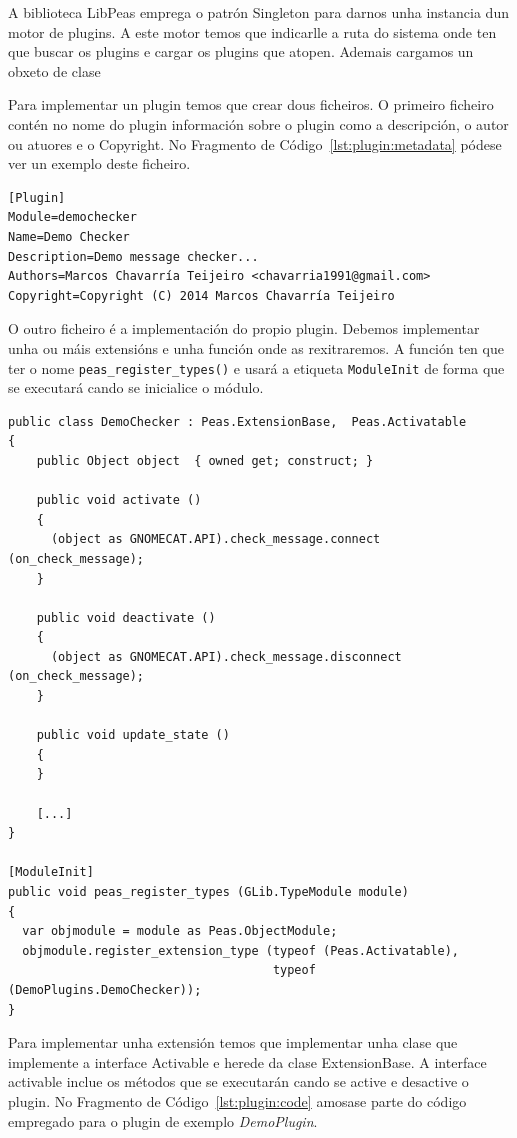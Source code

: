 A biblioteca LibPeas emprega o patrón Singleton para darnos unha instancia dun motor de plugins. A este motor temos que indicarlle a ruta do sistema onde ten que buscar os plugins e cargar os plugins que atopen. Ademais cargamos un obxeto de clase

Para implementar un plugin temos que crear dous ficheiros. O primeiro ficheiro contén no nome do plugin información sobre o plugin como a descripción, o autor ou atuores e o Copyright. No Fragmento de Código~\ref{lst:plugin:metadata} pódese ver un exemplo deste ficheiro.

\begin{lstlisting}[label=lst:plugin:metadata,caption=Ficheiro de metadatos do plugin]
[Plugin]
Module=demochecker
Name=Demo Checker
Description=Demo message checker...
Authors=Marcos Chavarría Teijeiro <chavarria1991@gmail.com>
Copyright=Copyright (C) 2014 Marcos Chavarría Teijeiro
\end{lstlisting}

O outro ficheiro é a implementación do propio plugin. Debemos implementar unha ou máis extensións e unha función onde as rexitraremos. A función ten que ter o nome \lstinline{peas_register_types()} e usará a etiqueta \lstinline{ModuleInit} de forma que se executará cando se inicialice o módulo.

\begin{lstlisting}[label=lst:plugin:code,caption=Fragmento da implementación do plugin DemoChecker]
public class DemoChecker : Peas.ExtensionBase,  Peas.Activatable
{
    public Object object  { owned get; construct; }

    public void activate ()
    {
      (object as GNOMECAT.API).check_message.connect (on_check_message);
    }

    public void deactivate ()
    {
      (object as GNOMECAT.API).check_message.disconnect (on_check_message);
    }

    public void update_state ()
    {
    }

    [...]
}

[ModuleInit]
public void peas_register_types (GLib.TypeModule module)
{
  var objmodule = module as Peas.ObjectModule;
  objmodule.register_extension_type (typeof (Peas.Activatable),
                                     typeof (DemoPlugins.DemoChecker));
}
\end{lstlisting}

Para implementar unha extensión temos que implementar unha clase que implemente a interface Activable e herede da clase ExtensionBase. A interface activable inclue os métodos que se executarán cando se active e desactive o plugin. No Fragmento de Código~\ref{lst:plugin:code} amosase parte do código empregado para o plugin de exemplo \emph{DemoPlugin}.
